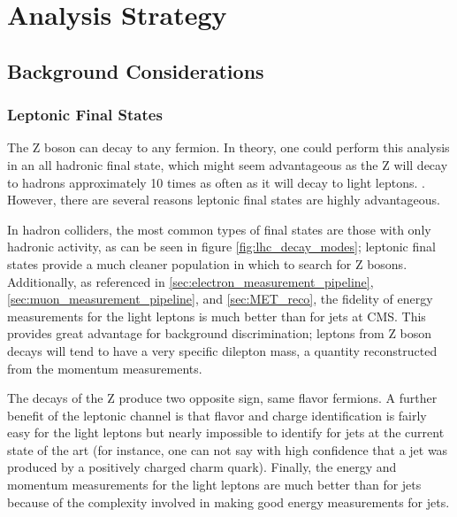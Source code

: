 \section{Analysis Strategy}

  \subsection{Background Considerations} \label{sec:background_considerations}

    \subsubsection{Leptonic Final States} \label{sec:leptonic_final_states}
      The Z boson can decay to any fermion. In theory, one could perform this analysis in an all hadronic final state, which might seem advantageous as the Z will decay to hadrons approximately 10 times as often as it will decay to light leptons. . However, there are several reasons leptonic final states are highly advantageous.

      In hadron colliders, the most common types of final states are those with only hadronic activity, as can be seen in figure \ref{fig:lhc_decay_modes}; leptonic final states provide a much cleaner population in which to search for Z bosons. Additionally, as referenced in \ref{sec:electron_measurement_pipeline}, \ref{sec:muon_measurement_pipeline}, and \ref{sec:MET_reco}, the fidelity of energy measurements for the light leptons is much better than for jets at CMS. This provides great advantage for background discrimination; leptons from Z boson decays will tend to have a very specific dilepton mass, a quantity reconstructed from the momentum measurements.

      The decays of the Z produce two opposite sign, same flavor fermions. A further benefit of the leptonic channel is that flavor and charge identification is fairly easy for the light leptons but nearly impossible to identify for jets at the current state of the art (for instance, one can not say with high confidence that a jet was produced by a positively charged charm quark). Finally, the energy and momentum measurements for the light leptons are much better than for jets because of the complexity involved in making good energy measurements for jets.  

